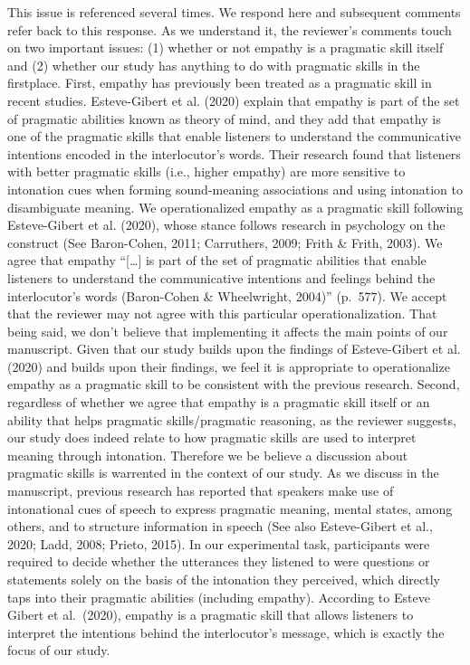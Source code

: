 \documentclass[]{article}
\begin{document}
This issue is referenced several times.
We respond here and subsequent comments refer back to this response.
As we understand it, the reviewer's comments touch on two important issues: (1) whether or not empathy is a pragmatic skill itself and (2) whether our study has anything to do with pragmatic skills in the firstplace.
First, empathy has previously been treated as a pragmatic skill in recent studies.
Esteve-Gibert et al. (2020) explain that empathy is part of the set of pragmatic abilities known as theory of mind, and they add that empathy is one of the pragmatic skills that enable listeners to understand the communicative intentions encoded in the interlocutor's words.
Their research found that listeners with better pragmatic skills (i.e., higher empathy) are more sensitive to intonation cues when forming sound-meaning associations and using intonation to disambiguate meaning.
We operationalized empathy as a pragmatic skill following Esteve-Gibert et al. (2020), whose stance follows research in psychology on the construct (See Baron-Cohen, 2011; Carruthers, 2009; Frith \& Frith, 2003).
We agree that empathy ``{[}\ldots{]} is part of the set of pragmatic abilities that enable listeners to understand the communicative intentions and feelings behind the interlocutor's words (Baron-Cohen \& Wheelwright, 2004)'' (p.~577).
We accept that the reviewer may not agree with this particular operationalization.
That being said, we don't believe that implementing it affects the main points of our manuscript.
Given that our study builds upon the findings of Esteve-Gibert et al. (2020) and builds upon their findings, we feel it is appropriate to operationalize empathy as a pragmatic skill to be consistent with the previous research.
Second, regardless of whether we agree that empathy is a pragmatic skill itself or an ability that helps pragmatic skills/pragmatic reasoning, as the reviewer suggests, our study does indeed relate to how pragmatic skills are used to interpret meaning through intonation.
Therefore we be believe a discussion about pragmatic skills is warrented in the context of our study.
As we discuss in the manuscript, previous research has reported that speakers make use of intonational cues of speech to express pragmatic meaning, mental states, among others, and to structure information in speech (See also Esteve-Gibert et al., 2020; Ladd, 2008; Prieto, 2015).
In our experimental task, participants were required to decide whether the utterances they listened to were questions or statements solely on the basis of the intonation they perceived, which directly taps into their pragmatic abilities (including empathy).
According to Esteve Gibert et al.~(2020), empathy is a pragmatic skill that allows listeners to interpret the intentions behind the interlocutor's message, which is exactly the focus of our study.
\end{document}
